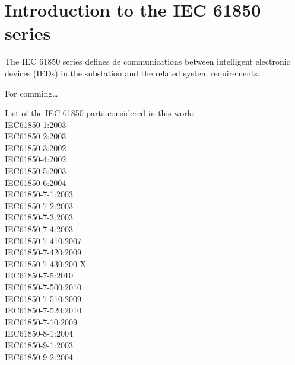 \chapter{Introduction to the IEC 61850 series}



The IEC 61850 series defines de communications between 
intelligent electronic devices (IEDs) in the substation 
and the related system requirements.




For comming\ldots  

List of the IEC 61850 parts considered 
in this work:  \\
IEC61850-1:2003 	\cite{IEC61850-1:2003} \\
IEC61850-2:2003		\cite{IEC61850-2:2003} \\
IEC61850-3:2002		\cite{IEC61850-3:2002} \\
IEC61850-4:2002		\cite{IEC61850-4:2002} \\
IEC61850-5:2003		\cite{IEC61850-5:2003} \\
IEC61850-6:2004		\cite{IEC61850-6:2004}  \\
IEC61850-7-1:2003	\cite{IEC61850-7-1:2003} \\
IEC61850-7-2:2003	\cite{IEC61850-7-2:2003} \\
IEC61850-7-3:2003	\cite{IEC61850-7-3:2003} \\
IEC61850-7-4:2003	\cite{IEC61850-7-4:2003} \\
IEC61850-7-410:2007	\cite{IEC61850-7-410:2007} \\
IEC61850-7-420:2009	\cite{IEC61850-7-420:2009} \\
IEC61850-7-430:200-X\cite{IEC61850-7-430:200-X} \\
IEC61850-7-5:2010	\cite{IEC61850-7-5:2010} \\
IEC61850-7-500:2010	\cite{IEC61850-7-500:2010} \\
IEC61850-7-510:2009	\cite{IEC61850-7-510:2009} \\
IEC61850-7-520:2010	\cite{IEC61850-7-520:2010} \\
IEC61850-7-10:2009	\cite{IEC61850-7-10:2009} \\
IEC61850-8-1:2004	\cite{IEC61850-8-1:2004} \\
IEC61850-9-1:2003	\cite{IEC61850-9-1:2003} \\
IEC61850-9-2:2004	\cite{IEC61850-9-2:2004} \\ 

